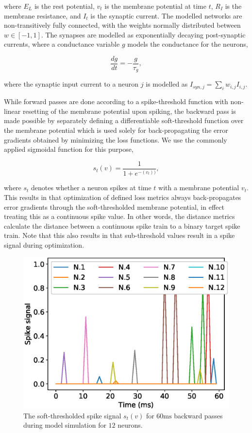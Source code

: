 \documentclass[mphil,deptreport,ai]{infthesis} %
\begin{document}
where $E_L$ is the rest potential, $v_t$ is the membrane potential at time $t$, $R_I$ is the membrane resistance, and $I_t$ is the synaptic current.
The modelled networks are non-transitively fully connected, with the weights normally distributed between $w \in [-1, 1]$. The synapses are modelled as exponentially decaying post-synaptic currents, where a conductance variable $g$ models the conductance for the neurons,

\begin{equation}
    \frac{dg}{dt} = -\frac{g}{\tau_g},
\end{equation}

where the synaptic input current to a neuron $j$ is modelled as $I_{syn,j} = \sum_{i} w_{i,j} I_{i,j}$.

While forward passes are done according to a spike-threshold function with non-linear resetting of the membrane potential upon spiking, the backward pass is made possible by separately defining a differentiable soft-threshold function over the membrane potential which is used solely for back-propagating the error gradients obtained by minimizing the loss functions. We use the commonly applied sigmoidal function for this purpose,

\begin{equation}
    s_t(v) = \frac{1}{1+e^{-(v_t))}},
\end{equation}

where $s_t$ denotes whether a neuron spikes at time $t$ with a membrane potential $v_t$.
This results in that optimization of defined loss metrics always back-propagates error gradients through the soft-thresholded membrane potential, in effect treating this as a continuous spike value. 
In other words, the distance metrics calculate the distance between a continuous spike train to a binary target spike train.
Note that this also results in that sub-threshold values result in a spike signal during optimization.

\begin{figure}
    \centering
    \vskip -0.1in
    \includegraphics[width=0.9\columnwidth]{figures/plot_spike_thresh_lif_ensembles_dales_0.eps}
    \vskip -0.1in
    \caption{The soft-thresholded spike signal $s_t(v)$ for $60 \si{\ms}$ backward passes during model simulation for $12$ neurons.}
    \label{fig:spike_thresh}
    \vskip -0.2in
\end{figure}
\end{document}
